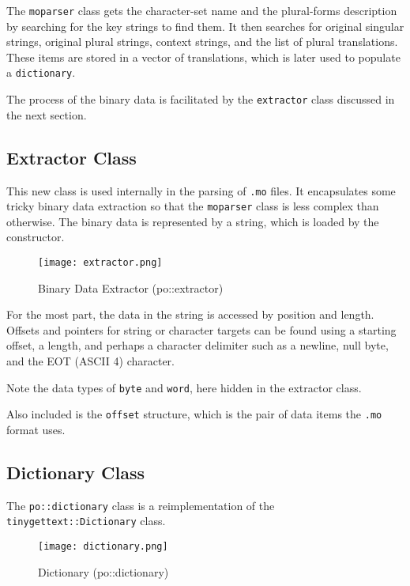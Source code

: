    The \texttt{moparser} class gets the character-set name and the
   plural-forms description by searching for the key strings to find them.
   It then searches for original singular strings, original
   plural strings, context strings, and the list of plural translations.
   These items are stored in a vector of translations, which is later
   used to populate a \texttt{dictionary}.

   The process of the binary data is facilitated by the \texttt{extractor}
   class discussed in the next section.

\subsection{Extractor Class}
\label{subsec:potext_extractor_class}

   This new class is used internally in the parsing of \texttt{.mo}
   files. It encapsulates some tricky binary data extraction
   so that the \texttt{moparser} class is less complex than otherwise.
   The binary data is represented by a string, which is loaded by the
   constructor.

\begin{figure}[H]
   \centering 
   \texttt{[image: extractor.png]}
   \caption{Binary Data Extractor (po::extractor)}
   \label{fig:potext_extractor}
\end{figure}

   For the most part, the data in the string is accessed by position and
   length. Offsets and pointers for string or character targets can be
   found using a starting offset, a length, and perhaps a character delimiter
   such as a newline, null byte, and the EOT (ASCII 4) character.

   Note the data types of \texttt{byte} and \texttt{word}, here hidden in the
   extractor class.

   Also included is the \texttt{offset} structure, which is the pair of data
   items the \texttt{.mo} format uses.

\subsection{Dictionary Class}
\label{subsec:potext_dictionary_class}

   The \texttt{po::dictionary} class is a reimplementation of the
   \texttt{tinygettext::Dictionary} class.

\begin{figure}[H]
   \centering 
   \texttt{[image: dictionary.png]}
   \caption{Dictionary (po::dictionary)}
   \label{fig:potext_dictionary}
\end{figure}

